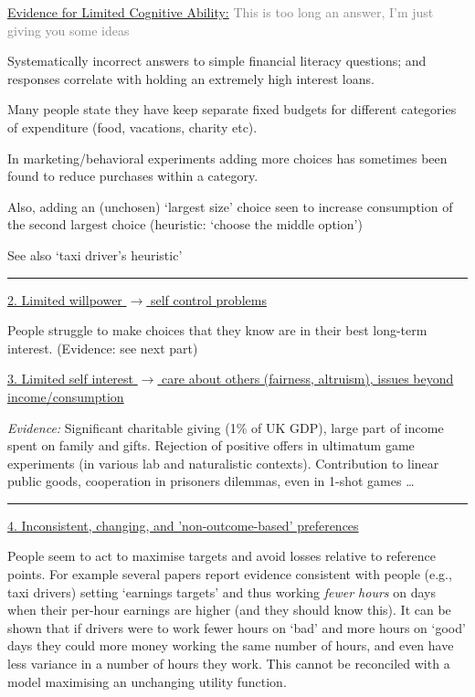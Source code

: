 \documentclass[]{article}
\begin{document}
\underline{Evidence for Limited Cognitive Ability:}
\textcolor{gray}{This is too long an answer, I'm just giving you some ideas}

Systematically incorrect answers to simple financial literacy questions;
and responses correlate with holding an extremely high interest loans.

Many people state they have keep separate fixed budgets for different
categories of expenditure (food, vacations, charity etc).

In marketing/behavioral experiments adding more choices has sometimes
been found to reduce purchases within a category.

Also, adding an (unchosen) `largest size' choice seen to increase
consumption of the second largest choice (heuristic: `choose the middle
option')

See also `taxi driver's heuristic'

\begin{center}\rule{0.5\linewidth}{\linethickness}\end{center}

\underline{2. Limited willpower $\rightarrow$  self control problems}

People struggle to make choices that they know are in their best
long-term interest. (Evidence: see next part)

\underline{3. Limited self interest $\rightarrow$  care about others (fairness, altruism), issues beyond income/consumption}

\textit{Evidence:} Significant charitable giving (1\% of UK GDP), large
part of income spent on family and gifts. Rejection of positive offers
in ultimatum game experiments (in various lab and naturalistic
contexts). Contribution to linear public goods, cooperation in prisoners
dilemmas, even in 1-shot games \ldots{}

\begin{center}\rule{0.5\linewidth}{\linethickness}\end{center}

\underline{4. Inconsistent, changing, and 'non-outcome-based' preferences}

\small

People seem to act to maximise targets and avoid losses relative to
reference points. For example several papers report evidence consistent
with people (e.g., taxi drivers) setting `earnings targets' and thus
working \textit{fewer hours} on days when their per-hour earnings are
higher (and they should know this). It can be shown that if drivers were
to work fewer hours on `bad' and more hours on `good' days they could
more money working the same number of hours, and even have less variance
in a number of hours they work. This cannot be reconciled with a model
maximising an unchanging utility function.
\end{document}
